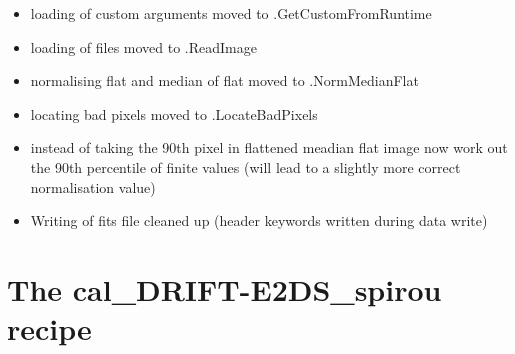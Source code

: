 \begin{itemize}
	\item loading of custom arguments moved to \spirouStartup.GetCustomFromRuntime

	\item loading of files moved to \spirouImage.ReadImage

	\item normalising flat and median of flat moved to \spirouImage.NormMedianFlat

	\item locating bad pixels moved to \spirouImage.LocateBadPixels

	\item instead of taking the 90th pixel in flattened meadian flat image now work out the 90th percentile of finite values (will lead to a slightly more correct normalisation value)

	\item Writing of fits file cleaned up (header keywords written during data write)
\end{itemize}


\section{The cal\_DRIFT-E2DS\_spirou recipe}
\label{ch:changelog:At4:cal_DRIFT-E2DS_spirou}

